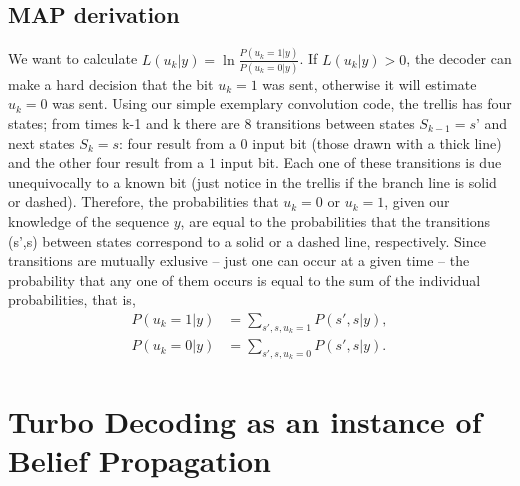\subsection{MAP derivation}
We want to calculate \(L(u_k|y) = \ln \frac{P(u_k = 1|y)}{P(u_k = 0|y)}\). If \(L(u_k |y) > 0\), the decoder can make a hard decision that the bit
\(u_k = 1\) was sent, otherwise it will estimate \(u_k = 0\) was sent. Using our simple exemplary convolution code, the trellis has four states; from times k-1 and k there are \(8\) transitions between states \(S_{k-1} = s’\) and next states \(S_k = s\): four result from a \(0\) input bit (those drawn with a thick line) and the other four result from a \(1\) input bit. Each one of these transitions is due unequivocally to a known bit (just notice in the trellis if the branch line is solid or dashed). Therefore, the probabilities that \(u_k = 0\) or \(u_k = 1\), given our knowledge of the sequence \(y\), are equal to the probabilities that the transitions (s’,s) between states correspond to a solid or a dashed line, respectively. Since transitions are mutually exlusive – just one can occur at a given time – the probability that any one of them occurs is equal to the sum of the individual probabilities, that is,
\begin{align*}
    P(u_k=1|y) &= \sum_{s', s, u_k=1}P(s', s|y),\\
    P(u_k=0|y) &= \sum_{s', s, u_k=0}P(s', s|y).  
\end{align*}


\section{Turbo Decoding as an instance of Belief Propagation}


